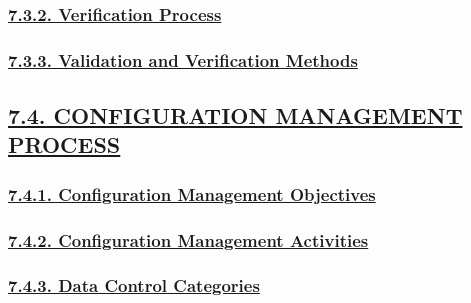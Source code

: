 \documentclass[
]{article}
\begin{document}
\hypertarget{verification-process}{%
\subsubsection{\texorpdfstring{\protect\hyperlink{verification-process-1}{7.3.2.
Verification
Process}}{7.3.2. Verification Process}}\label{verification-process}}

\hypertarget{validation-and-verification-methods}{%
\subsubsection{\texorpdfstring{\protect\hyperlink{validation-and-verification-methods-1}{7.3.3.
Validation and Verification
Methods}}{7.3.3. Validation and Verification Methods}}\label{validation-and-verification-methods}}

\hypertarget{configuration-management-process}{%
\subsection{\texorpdfstring{\protect\hyperlink{configuration-management-process-1}{7.4.
CONFIGURATION MANAGEMENT
PROCESS}}{7.4. CONFIGURATION MANAGEMENT PROCESS}}\label{configuration-management-process}}

\hypertarget{configuration-management-objectives}{%
\subsubsection{\texorpdfstring{\protect\hyperlink{configuration-management-objectives-1}{7.4.1.
Configuration Management
Objectives}}{7.4.1. Configuration Management Objectives}}\label{configuration-management-objectives}}

\hypertarget{configuration-management-activities}{%
\subsubsection{\texorpdfstring{\protect\hyperlink{configuration-management-activities-1}{7.4.2.
Configuration Management
Activities}}{7.4.2. Configuration Management Activities}}\label{configuration-management-activities}}

\hypertarget{data-control-categories}{%
\subsubsection{\texorpdfstring{\protect\hyperlink{data-control-categories-1}{7.4.3.
Data Control
Categories}}{7.4.3. Data Control Categories}}\label{data-control-categories}}
\end{document}
